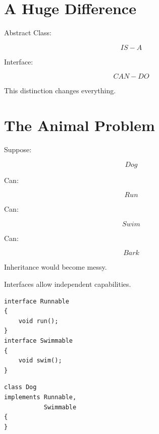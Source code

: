 \documentclass[11pt,a4paper]{book}
\begin{document}
\section{A Huge Difference}

Abstract Class:

\[
IS\!-\!A
\]


Interface:

\[
CAN\!-\!DO
\]


This distinction changes everything.


\section{The Animal Problem}

Suppose:

\[
Dog
\]


Can:

\[
Run
\]


Can:

\[
Swim
\]


Can:

\[
Bark
\]


Inheritance would become messy.


Interfaces allow independent capabilities.


\begin{verbatim}
interface Runnable
{
    void run();
}
interface Swimmable
{
    void swim();
}
\end{verbatim}


\begin{verbatim}
class Dog
implements Runnable,
           Swimmable
{
}
\end{verbatim}
\end{document}
